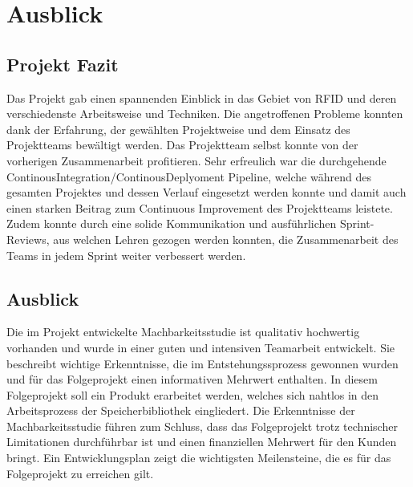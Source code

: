 \chapter{Ausblick}
\label{ch:Ausblick}

\section{Projekt Fazit}
Das Projekt gab einen spannenden Einblick in das Gebiet von RFID und deren verschiedenste Arbeitsweise und Techniken. Die angetroffenen Probleme konnten dank der Erfahrung, der gewählten Projektweise und dem Einsatz des Projektteams bewältigt werden. Das Projektteam selbst konnte von der vorherigen Zusammenarbeit profitieren. Sehr erfreulich war die durchgehende ContinousIntegration/ContinousDeplyoment Pipeline, welche während des gesamten Projektes und dessen Verlauf eingesetzt werden konnte und damit auch einen starken Beitrag zum Continuous Improvement des Projektteams leistete. Zudem konnte durch eine solide Kommunikation und ausführlichen Sprint-Reviews, aus welchen Lehren gezogen werden konnten, die Zusammenarbeit des Teams in jedem Sprint weiter verbessert werden.

\section{Ausblick}
Die im Projekt entwickelte Machbarkeitsstudie ist qualitativ hochwertig vorhanden und wurde in einer guten und intensiven Teamarbeit entwickelt. Sie beschreibt wichtige Erkenntnisse, die im Entstehungssprozess gewonnen wurden und für das Folgeprojekt einen informativen Mehrwert enthalten. In diesem Folgeprojekt soll ein Produkt erarbeitet werden, welches sich nahtlos in den Arbeitsprozess der Speicherbibliothek eingliedert. Die Erkenntnisse der Machbarkeitsstudie führen zum Schluss, dass das Folgeprojekt trotz technischer Limitationen durchführbar ist und einen finanziellen Mehrwert für den Kunden bringt. Ein Entwicklungsplan zeigt die wichtigsten Meilensteine, die es für das Folgeprojekt zu erreichen gilt.

